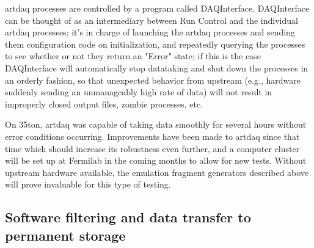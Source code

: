 artdaq processes are controlled by a program called
DAQInterface. DAQInterface can be thought of as an intermediary
between Run Control and the individual artdaq processes; it's in
charge of launching the artdaq processes and sending them
configuration code on initialization, and repeatedly querying the
processes to see whether or not they return an "Error" state; if this
is the case DAQInterface will automatically stop datataking and shut
down the processes in an orderly fashion, so that unexpected behavior
from upstream (e.g., hardware suddenly sending an unmanageably high
rate of data) will not result in improperly closed output files,
zombie processes, etc.

On 35ton, artdaq was capable of taking data smoothly for several hours
without error conditions occurring. Improvements have been made to
artdaq since that time which should increase its robustness even
further, and a computer cluster will be set up at Fermilab in the
coming months to allow for new tests. Without upstream hardware
available, the emulation fragment generators described above will
prove invaluable for this type of testing.




\subsection{Software filtering and data transfer to permanent storage}



